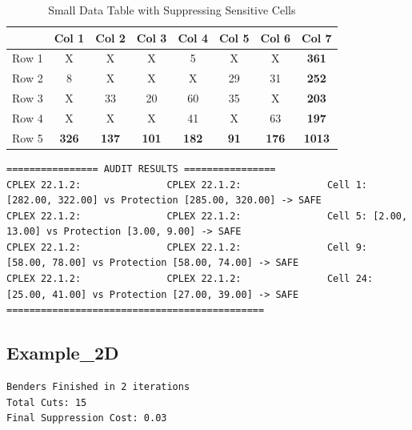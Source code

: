 \documentclass[11pt,a4paper]{article}
\begin{document}
\begin{table}[H]
    \centering
    \begin{tabular}{l | c c c c c c c}
             & Col 1 & Col 2 & Col 3 & Col 4 & Col 5 & Col 6 & Col 7 \\
        \toprule
        Row 1 & X    & X    & X    & 5    & X   & X   & \textbf{361} \\
        Row 2 & 8    & X  & X   & X   & 29   & 31   & \textbf{252} \\
        Row 3 & X   & 33   & 20   & 60   & 35   & X   & \textbf{203} \\
        Row 4 & X    & X   & X  & 41   & X   & 63   & \textbf{197} \\
        Row 5 & \textbf{326} & \textbf{137} & \textbf{101} & \textbf{182} & \textbf{91} & \textbf{176} & \textbf{1013} \\
    \end{tabular}
    \caption{Small Data Table with Suppressing Sensitive Cells}
    \label{tab:small-suppressed-table}
\end{table}

\begin{lstlisting}
================ AUDIT RESULTS ================
CPLEX 22.1.2:               CPLEX 22.1.2:               Cell 1: [282.00, 322.00] vs Protection [285.00, 320.00] -> SAFE
CPLEX 22.1.2:               CPLEX 22.1.2:               Cell 5: [2.00, 13.00] vs Protection [3.00, 9.00] -> SAFE
CPLEX 22.1.2:               CPLEX 22.1.2:               Cell 9: [58.00, 78.00] vs Protection [58.00, 74.00] -> SAFE
CPLEX 22.1.2:               CPLEX 22.1.2:               Cell 24: [25.00, 41.00] vs Protection [27.00, 39.00] -> SAFE
=============================================
\end{lstlisting}
\subsection{Example\_2D}

\begin{lstlisting}
Benders Finished in 2 iterations
Total Cuts: 15
Final Suppression Cost: 0.03
\end{lstlisting}
\end{document}
